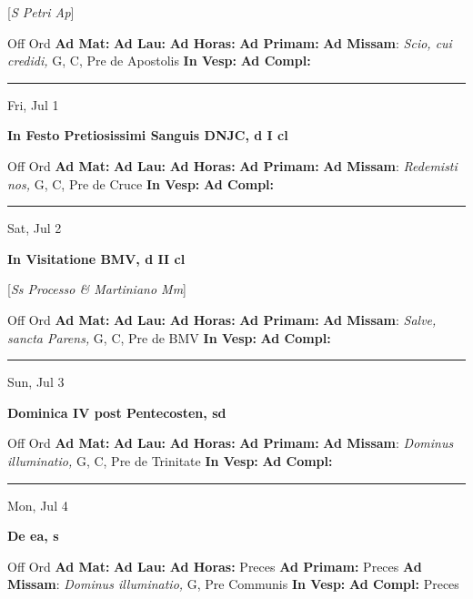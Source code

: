 \documentclass[letterpaper, 10pt]{article}
\begin{document}
[\textit{S Petri Ap}]
\begin{justify}
Off Ord
\textbf{Ad Mat: }
\textbf{Ad Lau: }
\textbf{Ad Horas: }
\textbf{Ad Primam: }
\textbf{Ad Missam}: \textit{Scio, cui credidi,} G, C, Pre de Apostolis
\textbf{In Vesp: }
\textbf{Ad Compl: }\end{justify}



\hrule
\begin{center}
Fri, Jul 1
\end{center}\textbf{ \large In Festo Pretiosissimi Sanguis DNJC, \textnormal{\normalsize d I cl}}
\begin{justify}
Off Ord
\textbf{Ad Mat: }
\textbf{Ad Lau: }
\textbf{Ad Horas: }
\textbf{Ad Primam: }
\textbf{Ad Missam}: \textit{Redemisti nos,} G, C, Pre de Cruce
\textbf{In Vesp: }
\textbf{Ad Compl: }\end{justify}



\hrule
\begin{center}
Sat, Jul 2
\end{center}\textbf{ \large In Visitatione BMV, \textnormal{\normalsize d II cl}}

[\textit{Ss Processo \& Martiniano Mm}]
\begin{justify}
Off Ord
\textbf{Ad Mat: }
\textbf{Ad Lau: }
\textbf{Ad Horas: }
\textbf{Ad Primam: }
\textbf{Ad Missam}: \textit{Salve, sancta Parens,} G, C, Pre de BMV
\textbf{In Vesp: }
\textbf{Ad Compl: }\end{justify}



\hrule
\begin{center}
Sun, Jul 3
\end{center}\textbf{ \large Dominica IV post Pentecosten, \textnormal{\normalsize sd}}
\begin{justify}
Off Ord
\textbf{Ad Mat: }
\textbf{Ad Lau: }
\textbf{Ad Horas: }
\textbf{Ad Primam: }
\textbf{Ad Missam}: \textit{Dominus illuminatio,} G, C, Pre de Trinitate
\textbf{In Vesp: }
\textbf{Ad Compl: }\end{justify}



\hrule
\begin{center}
Mon, Jul 4
\end{center}\textbf{ \large De ea, \textnormal{\normalsize s}}
\begin{justify}
Off Ord
\textbf{Ad Mat: }
\textbf{Ad Lau: }
\textbf{Ad Horas: }Preces
\textbf{Ad Primam: }Preces
\textbf{Ad Missam}: \textit{Dominus illuminatio,} G, Pre Communis
\textbf{In Vesp: }
\textbf{Ad Compl: }Preces\end{justify}
\end{document}

